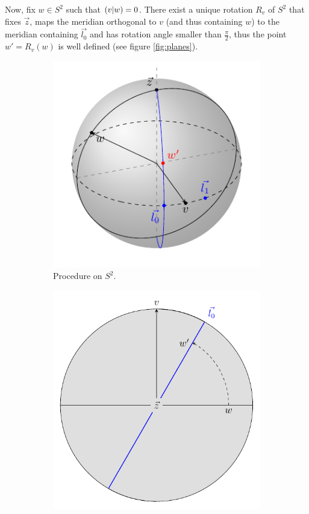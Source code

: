 \documentclass[10pt]{article}
\begin{document}
Now, fix $w\in S^2$ such that $\left( v \vert w\right)=0$. There exist a unique rotation $R_v$ of $S^2$ that fixes $\vec{z}$, maps the meridian orthogonal to $v$ (and thus containing $w$) to the meridian containing $\vec{l_0}$ and has rotation angle smaller than $\frac{\pi}{2}$, thus the point $w' = R_v(w)$ is well defined (see figure \ref{fig:planes}).
\begin{figure}[hbt]
	\centering
	\begin{subfigure}[b]{0.4\textwidth}
		\centering
		\includegraphics[width=\textwidth]{construction.pdf}
		\caption{Procedure on $S^2$.}
	\end{subfigure}
	\hfill
	\begin{subfigure}[b]{.4\textwidth}
		\centering
		\includegraphics[width=\textwidth]{xy.pdf}

\end{subfigure}
\end{figure}
\end{document}
